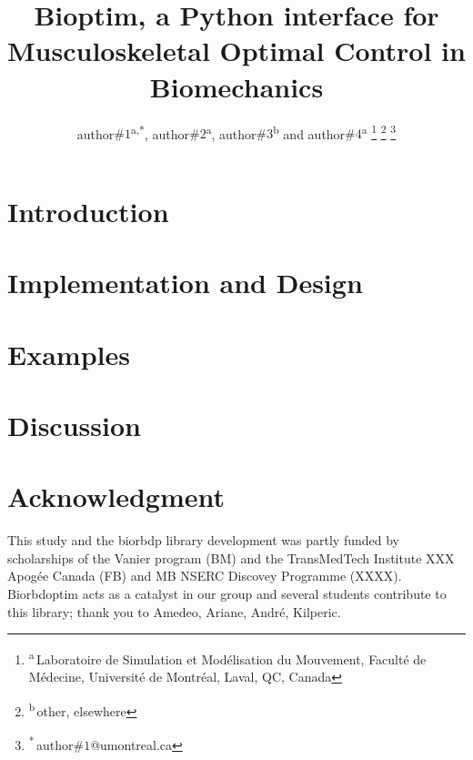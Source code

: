 \documentclass[letterpaper, 10 pt, conference]{ieeeconf}  %
\title{\LARGE \bf Bioptim, a Python interface for Musculoskeletal Optimal Control in Biomechanics}
\author{author$\#1$\textsuperscript{a,*}, author$\#2$\textsuperscript{a}, author$\#3$\textsuperscript{b}  and  author$\#4$\textsuperscript{a}%
\thanks{\textsuperscript{a}\,Laboratoire de Simulation et Modélisation du Mouvement, Faculté de Médecine, Université de Montréal, Laval, QC, Canada}%
\thanks{\textsuperscript{b}\,other, elsewhere}%
\thanks{\textsuperscript{*}\,author$\#1$@umontreal.ca}
}
\begin{document}
\maketitle
\thispagestyle{plain}
\pagestyle{plain}



\section{Introduction}\label{sec:introduction}


\section{Implementation and Design}\label{sec:design&impl}


\section{Examples}\label{sec:Examples}


\section{Discussion}\label{sec:discussion}


\section*{Acknowledgment}
This study and the biorbdp library development was partly funded by scholarships of the  Vanier program (BM) and the TransMedTech Institute XXX Apogée Canada (FB) and MB NSERC Discovey Programme (XXXX). Biorbdoptim acts as a catalyst in our group and several students contribute to this library; thank you to Amedeo, Ariane, André, Kilperic. 








\newpage
\label{sec:appendix}
\end{document}
